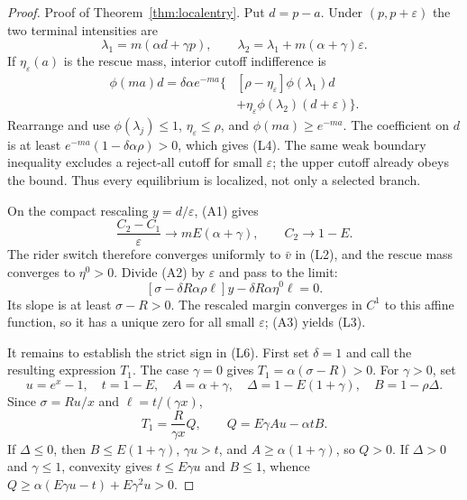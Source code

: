 \documentclass[mnsc,blindrev]{informs3}
\newcommand{\ph}{\phi}
\begin{document}
\begin{proof}{Proof of Theorem~\ref{thm:localentry}.}
Put $d=p-a$.  Under $(p,p+\varepsilon)$ the two terminal intensities are
\[
 \lambda_1=m(\alpha d+\gamma p),\qquad
 \lambda_2=\lambda_1+m(\alpha+\gamma)\varepsilon.           \tag{A1}
\]
If $\eta_\varepsilon(a)$ is the rescue mass, interior cutoff indifference is
\[
 \begin{aligned}
 \ph(ma)d=\delta\alpha e^{-ma}\{&[\rho-\eta_\varepsilon]
 \ph(\lambda_1)d\\
 &+\eta_\varepsilon\ph(\lambda_2)(d+\varepsilon)\}.
 \end{aligned}                                               \tag{A2}
\]
Rearrange and use $\ph(\lambda_j)\le1$,
$\eta_\varepsilon\le\rho$, and $\ph(ma)\ge e^{-ma}$.  The
coefficient on $d$ is at least $e^{-ma}(1-\delta\alpha\rho)>0$, which gives
(L4).  The same weak boundary inequality excludes a reject-all cutoff for
small $\varepsilon$; the upper cutoff already obeys the bound.  Thus every
equilibrium is localized, not only a selected branch.

On the compact rescaling $y=d/\varepsilon$, (A1) gives
\[
 \frac{C_2-C_1}{\varepsilon}\to mE(\alpha+\gamma),\qquad
 C_2\to1-E.
\]
The rider switch therefore converges uniformly to $\bar v$ in (L2), and the
rescue mass converges to $\eta^0>0$.  Divide (A2) by $\varepsilon$ and pass
to the limit:
\[
 [\sigma-\delta R\alpha\rho\ell]y
 -\delta R\alpha\eta^0\ell=0.                             \tag{A3}
\]
Its slope is at least $\sigma-R>0$.  The rescaled margin converges in $C^1$ to
this affine function, so it has a unique zero for all small
$\varepsilon$; (A3) yields (L3).

It remains to establish the strict sign in (L6).  First set $\delta=1$ and
call the resulting expression $T_1$.  The case $\gamma=0$ gives
$T_1=\alpha(\sigma-R)>0$.  For $\gamma>0$, set
\[
 u=e^x-1,\quad t=1-E,\quad A=\alpha+\gamma,\quad
 \Delta=1-E(1+\gamma),\quad B=1-\rho\Delta.
\]
Since $\sigma=Ru/x$ and $\ell=t/(\gamma x)$,
\[
 T_1=\frac{R}{\gamma x}Q,\qquad
 Q=E\gamma Au-\alpha tB.                                   \tag{A4}
\]
If $\Delta\le0$, then $B\le E(1+\gamma)$,
$\gamma u>t$, and $A\ge\alpha(1+\gamma)$, so $Q>0$.  If
$\Delta>0$ and $\gamma\le1$, convexity gives
$t\le E\gamma u$ and $B\le1$, whence
$Q\ge\alpha(E\gamma u-t)+E\gamma^2u>0$.


\end{proof}
\end{document}
